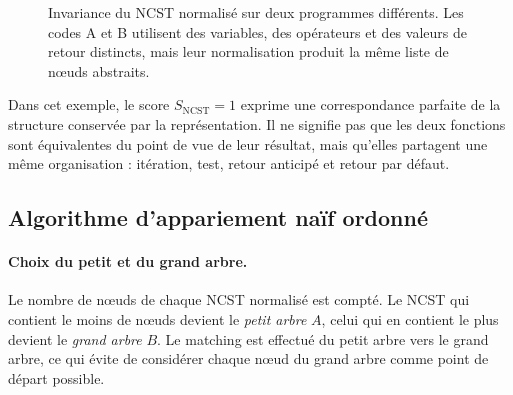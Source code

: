 {\begin{figure}[htbp]
{%
}
\caption{Invariance du NCST normalisé sur deux programmes différents. Les
codes A et B utilisent des variables, des opérateurs et des valeurs de retour
distincts, mais leur normalisation produit la même liste de nœuds abstraits.}
\label{fig:ncst_equivalence}
\end{figure}

Dans cet exemple, le score $S_{\mathrm{NCST}} = 1$ exprime une correspondance
parfaite de la structure conservée par la représentation. Il ne signifie pas
que les deux fonctions sont équivalentes du point de vue de leur résultat,
mais qu'elles partagent une même organisation : itération, test, retour
anticipé et retour par défaut.

\subsection{Algorithme d'appariement naïf ordonné}
\label{sec:matching}

\paragraph{Choix du petit et du grand arbre.}
Le nombre de nœuds de chaque NCST normalisé est compté. Le NCST qui contient le
moins de nœuds devient le \emph{petit arbre} $A$, celui qui en contient le plus
devient le \emph{grand arbre} $B$. Le matching est effectué du petit arbre vers
le grand arbre, ce qui évite de considérer chaque nœud du grand arbre comme
point de départ possible.

}

